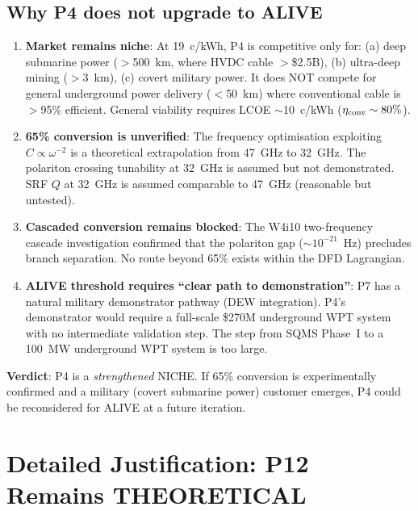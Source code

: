 \documentclass[11pt]{article}
\begin{document}
\subsection{Why P4 does not upgrade to ALIVE}

\begin{enumerate}
\item \textbf{Market remains niche}: At 19~c/kWh, P4 is competitive only
  for: (a) deep submarine power ($>$500~km, where HVDC cable $>$\$2.5B),
  (b) ultra-deep mining ($>$3~km), (c) covert military power. It does NOT
  compete for general underground power delivery ($<$50~km) where
  conventional cable is $>$95\% efficient. General viability requires
  LCOE $\sim$10~c/kWh ($\eta_{\rm conv} \sim 80\%$).

\item \textbf{65\% conversion is unverified}: The frequency optimisation
  exploiting $C \propto \omega^{-2}$ is a theoretical extrapolation from
  47~GHz to 32~GHz. The polariton crossing tunability at 32~GHz is assumed
  but not demonstrated. SRF $Q$ at 32~GHz is assumed comparable to 47~GHz
  (reasonable but untested).

\item \textbf{Cascaded conversion remains blocked}: The W4i10 two-frequency
  cascade investigation confirmed that the polariton gap ($\sim 10^{-21}$~Hz)
  precludes branch separation. No route beyond 65\% exists within the DFD
  Lagrangian.

\item \textbf{ALIVE threshold requires ``clear path to demonstration''}:
  P7 has a natural military demonstrator pathway (DEW integration). P4's
  demonstrator would require a full-scale \$270M underground WPT system
  with no intermediate validation step. The step from SQMS Phase~I to
  a 100~MW underground WPT system is too large.
\end{enumerate}

\textbf{Verdict}: P4 is a \emph{strengthened} NICHE. If 65\% conversion is
experimentally confirmed and a military (covert submarine power) customer
emerges, P4 could be reconsidered for ALIVE at a future iteration.

\section{Detailed Justification: P12 Remains THEORETICAL}
\label{sec:P12-theoretical}
\end{document}
